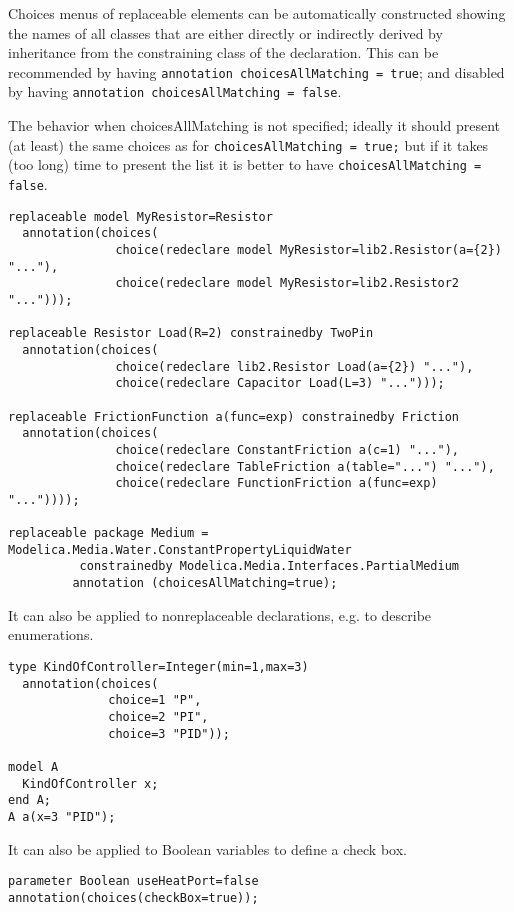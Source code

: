 Choices menus of replaceable elements can be automatically constructed
showing the names of all classes that are either directly or indirectly
derived by inheritance from the constraining class of the declaration.
This can be recommended by having \lstinline!annotation choicesAllMatching = true!; and disabled by having 
\lstinline!annotation choicesAllMatching = false!. 
\begin{nonnormative}
The behavior when choicesAllMatching is not specified;
ideally it should present (at least) the same choices as for
\lstinline!choicesAllMatching = true;! but if it takes (too long) time to present
the list it is better to have \lstinline!choicesAllMatching = false!.
\end{nonnormative}

\begin{example}
\begin{lstlisting}[language=modelica]
replaceable model MyResistor=Resistor
  annotation(choices(
               choice(redeclare model MyResistor=lib2.Resistor(a={2}) "..."),
               choice(redeclare model MyResistor=lib2.Resistor2 "...")));

replaceable Resistor Load(R=2) constrainedby TwoPin
  annotation(choices(
               choice(redeclare lib2.Resistor Load(a={2}) "..."),
               choice(redeclare Capacitor Load(L=3) "...")));

replaceable FrictionFunction a(func=exp) constrainedby Friction
  annotation(choices(
               choice(redeclare ConstantFriction a(c=1) "..."),
               choice(redeclare TableFriction a(table="...") "..."),
               choice(redeclare FunctionFriction a(func=exp) "..."))));

replaceable package Medium = Modelica.Media.Water.ConstantPropertyLiquidWater
          constrainedby Modelica.Media.Interfaces.PartialMedium
	     annotation (choicesAllMatching=true);
\end{lstlisting}

It can also be applied to nonreplaceable declarations, e.g. to
describe enumerations.
\begin{lstlisting}[language=modelica]
type KindOfController=Integer(min=1,max=3)
  annotation(choices(
              choice=1 "P",
              choice=2 "PI",
              choice=3 "PID"));

model A
  KindOfController x;
end A;
A a(x=3 "PID");
\end{lstlisting}

It can also be applied to Boolean variables to define a check
box.
\begin{lstlisting}[language=modelica]
parameter Boolean useHeatPort=false annotation(choices(checkBox=true));
\end{lstlisting}

\end{example}
